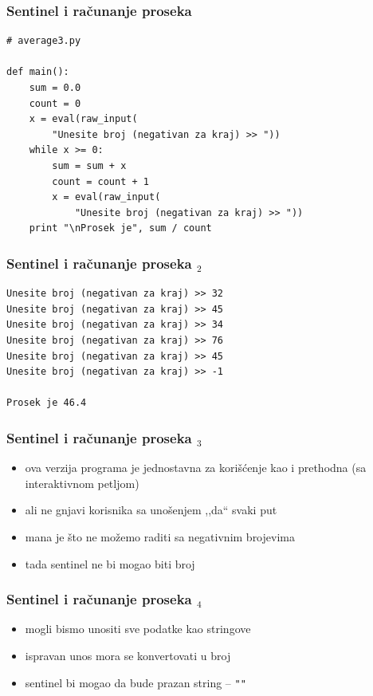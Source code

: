 \documentclass[utf8,compress]{beamer}
\begin{document}
\begin{frame}[fragile]
  \frametitle{Sentinel i računanje proseka}
\begin{verbatim}
# average3.py

def main():
    sum = 0.0
    count = 0
    x = eval(raw_input(
        "Unesite broj (negativan za kraj) >> "))
    while x >= 0:
        sum = sum + x
        count = count + 1
        x = eval(raw_input(
            "Unesite broj (negativan za kraj) >> "))
    print "\nProsek je", sum / count
\end{verbatim}
\end{frame}

\begin{frame}[fragile]
  \frametitle{Sentinel i računanje proseka $_2$}
\begin{verbatim}
Unesite broj (negativan za kraj) >> 32
Unesite broj (negativan za kraj) >> 45
Unesite broj (negativan za kraj) >> 34
Unesite broj (negativan za kraj) >> 76
Unesite broj (negativan za kraj) >> 45
Unesite broj (negativan za kraj) >> -1

Prosek je 46.4
\end{verbatim}
\end{frame}

\begin{frame}[fragile]
  \frametitle{Sentinel i računanje proseka $_3$}
  \begin{itemize}
    \item ova verzija programa je jednostavna za korišćenje kao i prethodna (sa interaktivnom petljom)
    \item ali ne gnjavi korisnika sa unošenjem ,,da`` svaki put
    \item mana je što ne možemo raditi sa negativnim brojevima
    \item tada sentinel ne bi mogao biti broj
  \end{itemize}
\end{frame}

\begin{frame}[fragile]
  \frametitle{Sentinel i računanje proseka $_4$}
  \begin{itemize}
    \item mogli bismo unositi sve podatke kao stringove
    \item ispravan unos mora se konvertovati u broj
    \item sentinel bi mogao da bude prazan string -- \texttt{""}
  \end{itemize}
\end{frame}
\end{document}
